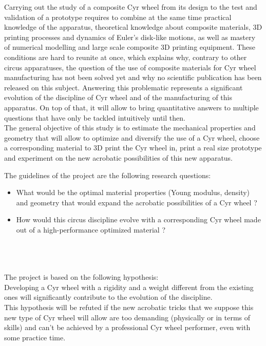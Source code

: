 Carrying out the study of a composite Cyr wheel from its design to the test and validation of a prototype requires to combine at the same time practical knowledge of the apparatus, theoretical knowledge about composite materials, 3D printing processes and dynamics of Euler’s disk-like motions, as well as mastery of numerical modelling and large scale composite 3D printing equipment. These conditions are hard to reunite at once, which explains why, contrary to other circus apparatuses, the question of the use of composite materials for Cyr wheel manufacturing has not been solved yet and why no scientific publication has been released on this subject. Answering this problematic represents a significant evolution of the discipline of Cyr wheel and of the manufacturing of this apparatus. On top of that, it will allow to bring quantitative answers to multiple questions that have only be tackled intuitively until then.\\
The general objective of this study is to estimate the mechanical properties and geometry that will allow to optimize and diversify the use of a Cyr wheel, choose a corresponding material to 3D print the Cyr wheel in, print a real size prototype and experiment on the new acrobatic possibilities of this new apparatus.

The guidelines of the project are the following research questions:
\begin{itemize}
\item What would be the optimal material properties (Young modulus, density) and geometry that would expand the acrobatic possibilities of a Cyr wheel ? 
\item	How would this circus discipline evolve with a corresponding Cyr wheel made out of a high-performance optimized material ? 
\end{itemize}
\\
\\
\\

The project is based on the following hypothesis:\\
Developing a Cyr wheel with a rigidity and a weight different from the existing ones will significantly contribute to the evolution of the discipline.\\
This hypothesis will be refuted if the new acrobatic tricks that we suppose this new type of Cyr wheel will allow are too demanding (physically or in terms of skills) and can’t be achieved by a professional Cyr wheel performer, even with some practice time.\\

